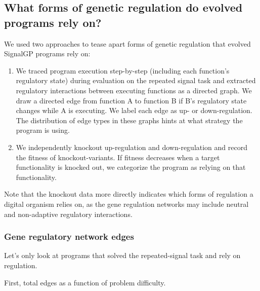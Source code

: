 \documentclass[
]{book}
\providecommand{\tightlist}{%
  \setlength{\itemsep}{0pt}\setlength{\parskip}{0pt}}
\begin{document}
\hypertarget{what-forms-of-genetic-regulation-do-evolved-programs-rely-on}{%
\subsection{What forms of genetic regulation do evolved programs rely on?}\label{what-forms-of-genetic-regulation-do-evolved-programs-rely-on}}

We used two approaches to tease apart forms of genetic regulation that evolved SignalGP programs rely on:

\begin{enumerate}
\def\labelenumi{\arabic{enumi}.}
\tightlist
\item
  We traced program execution step-by-step (including each function's regulatory state) during evaluation on the repeated signal task and extracted regulatory interactions between executing functions as a directed graph.
  We draw a directed edge from function A to function B if B's regulatory state changes while A is executing.
  We label each edge as up- or down-regulation. The distribution of edge types in these graphs hints at what strategy the program is using.
\item
  We independently knockout up-regulation and down-regulation and record the fitness of knockout-variants.
  If fitness decreases when a target functionality is knocked out, we categorize the program as relying on that functionality.
\end{enumerate}

Note that the knockout data more directly indicates which forms of regulation a digital organism relies on,
as the gene regulation networks may include neutral and non-adaptive regulatory interactions.

\hypertarget{gene-regulatory-network-edges}{%
\subsubsection{Gene regulatory network edges}\label{gene-regulatory-network-edges}}

Let's only look at programs that solved the repeated-signal task and rely on regulation.

First, total edges as a function of problem difficulty.
\end{document}
